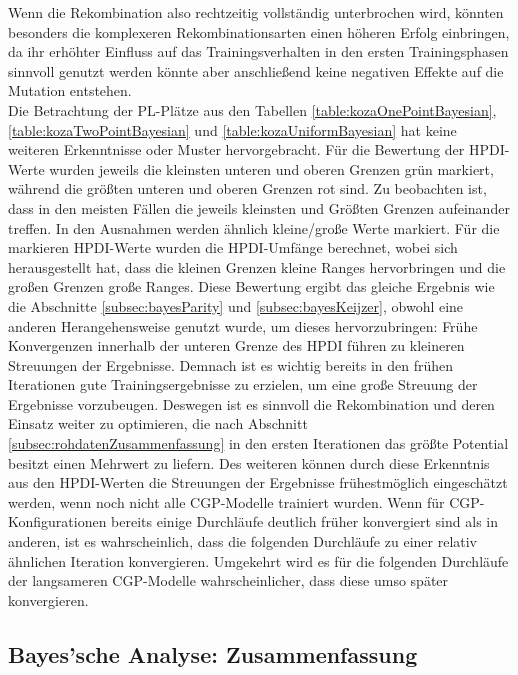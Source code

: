 Wenn die Rekombination also rechtzeitig vollständig unterbrochen wird, könnten besonders die komplexeren Rekombinationsarten einen höheren Erfolg einbringen, da ihr erhöhter Einfluss auf das Trainingsverhalten in den ersten Trainingsphasen sinnvoll genutzt werden könnte aber anschließend keine negativen Effekte auf die Mutation entstehen.\\
Die Betrachtung der PL-Plätze aus den Tabellen \ref{table:kozaOnePointBayesian}, \ref{table:kozaTwoPointBayesian} und \ref{table:kozaUniformBayesian} hat keine weiteren Erkenntnisse oder Muster hervorgebracht.
Für die Bewertung der HPDI-Werte wurden jeweils die kleinsten unteren und oberen Grenzen grün markiert, während die größten unteren und oberen Grenzen rot sind.
Zu beobachten ist, dass in den meisten Fällen die jeweils kleinsten und Größten Grenzen aufeinander treffen.
In den Ausnahmen werden ähnlich kleine/große Werte markiert.
Für die markieren HPDI-Werte wurden die HPDI-Umfänge berechnet, wobei sich herausgestellt hat, dass die kleinen Grenzen kleine Ranges hervorbringen und die großen Grenzen große Ranges.
Diese Bewertung ergibt das gleiche Ergebnis wie die Abschnitte \ref{subsec:bayesParity} und \ref{subsec:bayesKeijzer}, obwohl eine anderen Herangehensweise genutzt wurde, um dieses hervorzubringen:
Frühe Konvergenzen innerhalb der unteren Grenze des HPDI führen zu kleineren Streuungen der Ergebnisse.
Demnach ist es wichtig bereits in den frühen Iterationen gute Trainingsergebnisse zu erzielen, um eine große Streuung der Ergebnisse vorzubeugen.
Deswegen ist es sinnvoll die Rekombination und deren Einsatz weiter zu optimieren, die nach Abschnitt \ref{subsec:rohdatenZusammenfassung} in den ersten Iterationen das größte Potential besitzt einen Mehrwert zu liefern.
Des weiteren können durch diese Erkenntnis aus den HPDI-Werten die Streuungen der Ergebnisse frühestmöglich eingeschätzt werden, wenn noch nicht alle CGP-Modelle trainiert wurden.
Wenn für CGP-Konfigurationen bereits einige Durchläufe deutlich früher konvergiert sind als in anderen, ist es wahrscheinlich, dass die folgenden Durchläufe zu einer relativ ähnlichen Iteration konvergieren.
Umgekehrt wird es für die folgenden Durchläufe der langsameren CGP-Modelle wahrscheinlicher, dass diese umso später konvergieren.


\subsection{Bayes'sche Analyse: Zusammenfassung}
\label{subsec:bayesZusammenfassung}

